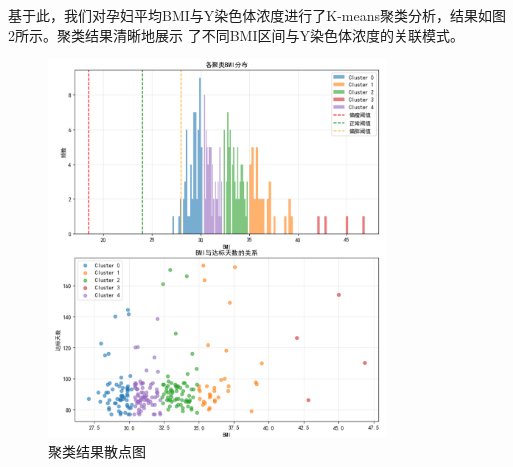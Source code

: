 \documentclass{article}
\begin{document}
基于此，我们对孕妇平均BMI与Y染色体浓度进行了K-means聚类分析，结果如图2所示。聚类结果清晰地展示
了不同BMI区间与Y染色体浓度的关联模式。
\begin{figure}[H]  %
    \centering  %
    \includegraphics[width=0.8\textwidth]{graph/julei1.png}  %
    \caption{聚类结果散点图}  %
    \label{fig:single}  %
\end{figure}
\end{document}
